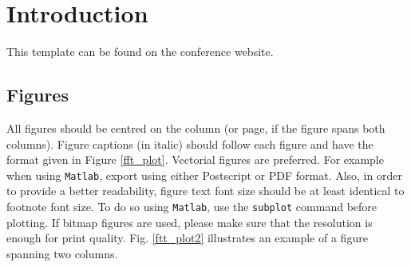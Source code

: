 \documentclass[twoside,a4paper]{article}
\title{\papertitle}
\newif\ifpdf
\begin{document}
\ifpdf %
  \DeclareGraphicsExtensions{.png,.jpg,.pdf}
\else  %
\fi

\maketitle

\begin{abstract}
This is the template file for the proceedings of the 22\textsuperscript{nd} International Conference on Digital Audio Effects (DAFx-19).
This template has been derived from WASPAA'99 templates and aims at producing conference proceedings in electronic form.
The format is essentially the one used for ICASSP conferences.
Please use either this \LaTeX{} or the accompanying Word formats when preparing your submission.
The templates are available in electronic form on \href{http://dafx2019.bcu.ac.uk/}{http://dafx2019.bcu.ac.uk/}.
\end{abstract}

\section{Introduction}
\label{sec:intro}
This template can be found on the conference website.

\subsection{Figures}
\label{ssec:figures}
All figures should be centred on the column (or page, if the figure spans both columns).
Figure captions (in italic) should follow each figure and have the format given in Figure \ref{fft_plot}.
%
Vectorial figures are preferred. For example when using
\texttt{Matlab}, export using either Postscript or PDF format. Also,
in order to provide a better readability, figure text font size
should be at least identical to footnote font size. To do so using
\texttt{Matlab}, use the \texttt{subplot} command before plotting.
If bitmap figures are used, please make sure that the resolution is
enough for print quality. Fig. \ref{ftt_plot2} illustrates an
example of a figure spanning two columns.
%
\end{document}
